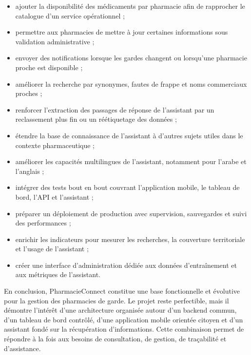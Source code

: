 \begin{itemize}
    \item ajouter la disponibilité des médicaments par pharmacie afin de rapprocher le catalogue d'un service opérationnel ;
    \item permettre aux pharmacies de mettre à jour certaines informations sous validation administrative ;
    \item envoyer des notifications lorsque les gardes changent ou lorsqu'une pharmacie proche est disponible ;
    \item améliorer la recherche par synonymes, fautes de frappe et noms commerciaux proches ;
    \item renforcer l'extraction des passages de réponse de l'assistant par un reclassement plus fin ou un réétiquetage des données ;
    \item étendre la base de connaissance de l'assistant à d'autres sujets utiles dans le contexte pharmaceutique ;
    \item améliorer les capacités multilingues de l'assistant, notamment pour l'arabe et l'anglais ;
    \item intégrer des tests bout en bout couvrant l'application mobile, le tableau de bord, l'API et l'assistant ;
    \item préparer un déploiement de production avec supervision, sauvegardes et suivi des performances ;
    \item enrichir les indicateurs pour mesurer les recherches, la couverture territoriale et l'usage de l'assistant ;
    \item créer une interface d'administration dédiée aux données d'entraînement et aux métriques de l'assistant.
\end{itemize}

En conclusion, PharmacieConnect constitue une base fonctionnelle et évolutive pour la gestion des
pharmacies de garde. Le projet reste perfectible, mais il démontre l'intérêt d'une architecture organisée
autour d'un backend commun, d'un tableau de bord contrôlé, d'une application mobile orientée citoyen et
d'un assistant fondé sur la récupération d'informations. Cette combinaison permet de répondre à la fois aux
besoins de consultation, de gestion, de traçabilité et d'assistance.
